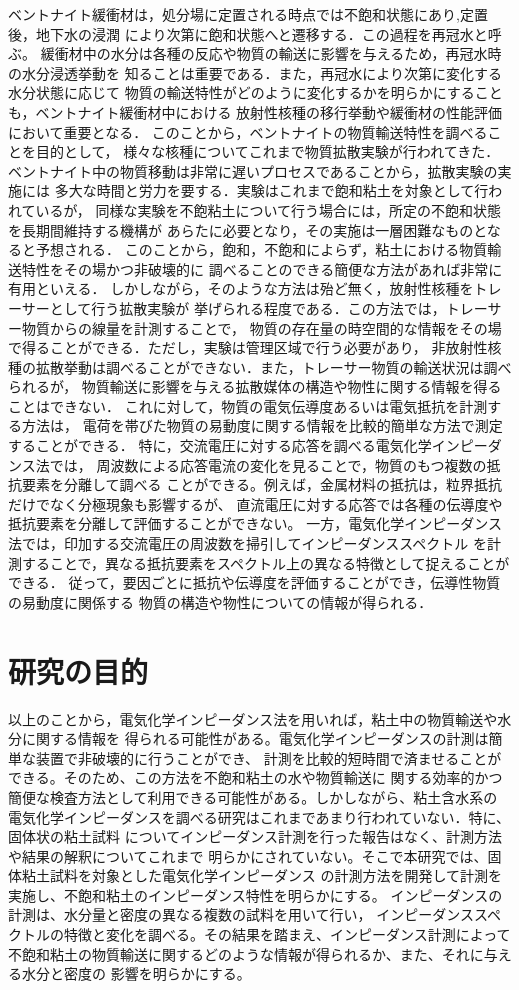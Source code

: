 ベントナイト緩衝材は，処分場に定置される時点では不飽和状態にあり,定置後，地下水の浸潤
により次第に飽和状態へと遷移する．この過程を再冠水と呼ぶ。
緩衝材中の水分は各種の反応や物質の輸送に影響を与えるため，再冠水時の水分浸透挙動を
知ることは重要である．また，再冠水により次第に変化する水分状態に応じて
物質の輸送特性がどのように変化するかを明らかにすることも，ベントナイト緩衝材中における
放射性核種の移行挙動や緩衝材の性能評価において重要となる．
このことから，ベントナイトの物質輸送特性を調べることを目的として，
様々な核種についてこれまで物質拡散実験が行われてきた．
ベントナイト中の物質移動は非常に遅いプロセスであることから，拡散実験の実施には
多大な時間と労力を要する．実験はこれまで飽和粘土を対象として行われているが，
同様な実験を不飽粘土について行う場合には，所定の不飽和状態を長期間維持する機構が
あらたに必要となり，その実施は一層困難なものとなると予想される．
このことから，飽和，不飽和によらず，粘土における物質輸送特性をその場かつ非破壊的に
調べることのできる簡便な方法があれば非常に有用といえる．
しかしながら，そのような方法は殆ど無く，放射性核種をトレーサーとして行う拡散実験が
挙げられる程度である．この方法では，トレーサー物質からの線量を計測することで，
物質の存在量の時空間的な情報をその場で得ることができる．ただし，実験は管理区域で行う必要があり，
非放射性核種の拡散挙動は調べることができない．また，トレーサー物質の輸送状況は調べられるが，
物質輸送に影響を与える拡散媒体の構造や物性に関する情報を得ることはできない．
これに対して，物質の電気伝導度あるいは電気抵抗を計測する方法は，
電荷を帯びた物質の易動度に関する情報を比較的簡単な方法で測定することができる．
特に，交流電圧に対する応答を調べる電気化学インピーダンス法では，
周波数による応答電流の変化を見ることで，物質のもつ複数の抵抗要素を分離して調べる
ことができる。例えば，金属材料の抵抗は，粒界抵抗だけでなく分極現象も影響するが、
直流電圧に対する応答では各種の伝導度や抵抗要素を分離して評価することができない。
一方，電気化学インピーダンス法では，印加する交流電圧の周波数を掃引してインピーダンススペクトル
を計測することで，異なる抵抗要素をスペクトル上の異なる特徴として捉えることができる．
従って，要因ごとに抵抗や伝導度を評価することができ，伝導性物質の易動度に関係する
物質の構造や物性についての情報が得られる．
\section{研究の目的}
以上のことから，電気化学インピーダンス法を用いれば，粘土中の物質輸送や水分に関する情報を
得られる可能性がある。電気化学インピーダンスの計測は簡単な装置で非破壊的に行うことができ、
計測を比較的短時間で済ませることができる。そのため、この方法を不飽和粘土の水や物質輸送に
関する効率的かつ簡便な検査方法として利用できる可能性がある。しかしながら、粘土含水系の
電気化学インピーダンスを調べる研究はこれまであまり行われていない．特に、固体状の粘土試料
についてインピーダンス計測を行った報告はなく、計測方法や結果の解釈についてこれまで
明らかにされていない。そこで本研究では、固体粘土試料を対象とした電気化学インピーダンス
の計測方法を開発して計測を実施し、不飽和粘土のインピーダンス特性を明らかにする。
インピーダンスの計測は、水分量と密度の異なる複数の試料を用いて行い，
インピーダンススペクトルの特徴と変化を調べる。その結果を踏まえ、インピーダンス計測によって
不飽和粘土の物質輸送に関するどのような情報が得られるか、また、それに与える水分と密度の
影響を明らかにする。
